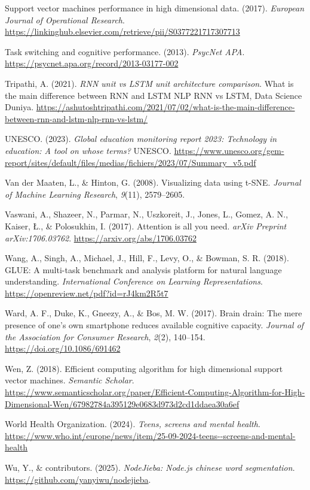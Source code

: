 \documentclass[
  titlepage]{article}
\newlength{\cslhangindent}
\newenvironment{CSLReferences}[2] %
 {\begin{list}{}{%
  \setlength{\itemindent}{0pt}
  \setlength{\leftmargin}{0pt}
  \setlength{\parsep}{0pt}
  \ifodd #1
   \setlength{\leftmargin}{\cslhangindent}
   \setlength{\itemindent}{-1\cslhangindent}
  \fi
  \setlength{\itemsep}{#2\baselineskip}}}
 {\end{list}}
\begin{document}
\begin{CSLReferences}{1}{0}
Support vector machines performance in high dimensional data. (2017).
\emph{European Journal of Operational Research}.
\url{https://linkinghub.elsevier.com/retrieve/pii/S0377221717307713}

Task switching and cognitive performance. (2013). \emph{PsycNet APA}.
\url{https://psycnet.apa.org/record/2013-03177-002}

Tripathi, A. (2021). \emph{RNN unit vs LSTM unit architecture
comparison}. What is the main difference between RNN and LSTM \textbar{}
NLP \textbar{} RNN vs LSTM, Data Science Duniya.
\url{https://ashutoshtripathi.com/2021/07/02/what-is-the-main-difference-between-rnn-and-lstm-nlp-rnn-vs-lstm/}

UNESCO. (2023). \emph{Global education monitoring report 2023:
Technology in education: A tool on whose terms?} UNESCO.
\url{https://www.unesco.org/gem-report/sites/default/files/medias/fichiers/2023/07/Summary_v5.pdf}

Van der Maaten, L., \& Hinton, G. (2008). Visualizing data using t-SNE.
\emph{Journal of Machine Learning Research}, \emph{9}(11), 2579--2605.

Vaswani, A., Shazeer, N., Parmar, N., Uszkoreit, J., Jones, L., Gomez,
A. N., Kaiser, Ł., \& Polosukhin, I. (2017). Attention is all you need.
\emph{arXiv Preprint arXiv:1706.03762}.
\url{https://arxiv.org/abs/1706.03762}

Wang, A., Singh, A., Michael, J., Hill, F., Levy, O., \& Bowman, S. R.
(2018). GLUE: A multi-task benchmark and analysis platform for natural
language understanding. \emph{International Conference on Learning
Representations}. \url{https://openreview.net/pdf?id=rJ4km2R5t7}

Ward, A. F., Duke, K., Gneezy, A., \& Bos, M. W. (2017). Brain drain:
The mere presence of one's own smartphone reduces available cognitive
capacity. \emph{Journal of the Association for Consumer Research},
\emph{2}(2), 140--154. \url{https://doi.org/10.1086/691462}

Wen, Z. (2018). Efficient computing algorithm for high dimensional
support vector machines. \emph{Semantic Scholar}.
\url{https://www.semanticscholar.org/paper/Efficient-Computing-Algorithm-for-High-Dimensional-Wen/67982784a395129e0683d973d2cd1ddaea30a6ef}

World Health Organization. (2024). \emph{Teens, screens and mental
health}.
\url{https://www.who.int/europe/news/item/25-09-2024-teens--screens-and-mental-health}

Wu, Y., \& contributors. (2025). \emph{NodeJieba: Node.js chinese word
segmentation}. \url{https://github.com/yanyiwu/nodejieba}.

\end{CSLReferences}
\end{document}
